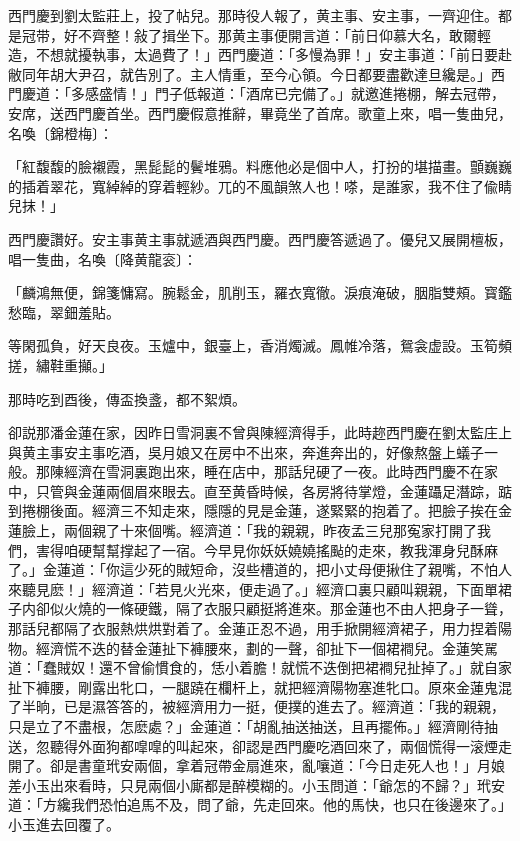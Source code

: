 西門慶到劉太監莊上，投了帖兒。那時役人報了，黄主事、安主事，一齊迎住。都是冠带，好不齊整！敍了揖坐下。那黄主事便開言道：「前日仰慕大名，敢爾輕造，不想就擾執事，太過費了！」西門慶道：「多慢為罪！」安主事道：「前日要赴敝同年胡大尹召，就告別了。主人情重，至今心領。今日都要盡歡達旦纔是。」西門慶道：「多感盛情！」門子低報道：「酒席已完備了。」就邀進捲棚，解去冠帶，安席，送西門慶首坐。西門慶假意推辭，畢竟坐了首席。歌童上來，唱一隻曲兒，名喚〔錦橙梅〕：

\begin{myquote}
「紅馥馥的臉襯霞，黑髭髭的鬢堆鴉。料應他必是個中人，打扮的堪描畫。顫巍巍的插着翠花，寬綽綽的穿着輕紗。兀的不風韻煞人也！嗏，是誰家，我不住了偸睛兒抹！」
\end{myquote}

西門慶讚好。安主事黄主事就遞酒與西門慶。西門慶答遞過了。優兒又展開檀板，唱一隻曲，名喚〔降黄龍衮〕：

\begin{myquote}
「麟鴻無便，錦箋慵寫。腕鬆金，肌削玉，羅衣寬徹。淚痕淹破，胭脂雙頰。寳鑑愁臨，翠鈿羞貼。

等閑孤負，好天良夜。玉爐中，銀臺上，香消燭滅。鳳帷冷落，鴛衾虚設。玉筍頻搓，繡鞋重攧。」
\end{myquote}

那時吃到酉後，傳盃換盞，都不絮煩。

卻説那潘金蓮在家，因昨日雪洞裏不曾與陳經濟得手，此時趂西門慶在劉太監庄上與黄主事安主事吃酒，吳月娘又在房中不出來，奔進奔出的，好像熬盤上蟻子一般。那陳經濟在雪洞裏跑出來，睡在店中，那話兒硬了一夜。此時西門慶不在家中，只管與金蓮兩個眉來眼去。直至黄昏時候，各房將待掌燈，金蓮躡足潛踪，踮到捲棚後面。經濟三不知走來，隱隱的見是金蓮，遂緊緊的抱着了。把臉子挨在金蓮臉上，兩個親了十來個嘴。經濟道：「我的親親，昨夜孟三兒那寃家打開了我們，害得咱硬幫幫撑起了一宿。今早見你妖妖嬈嬈搖颭的走來，教我渾身兒酥麻了。」金蓮道：「你這少死的賊短命，沒些槽道的，把小丈母便揪住了親嘴，不怕人來聽見麽！」經濟道：「若見火光來，便走過了。」經濟口裏只顧叫親親，下面單裙子内卻似火燒的一條硬鐵，隔了衣服只顧挺將進來。那金蓮也不由人把身子一聳，那話兒都隔了衣服熱烘烘對着了。金蓮正忍不過，用手掀開經濟裙子，用力捏着陽物。經濟慌不迭的替金蓮扯下褲腰來，劃的一聲，卻扯下一個裙襇兒。金蓮笑駡道：「蠢賊奴！還不曾偷慣食的，恁小着膽！就慌不迭倒把裙襇兒扯掉了。」就自家扯下褲腰，剛露出牝口，一腿蹺在欄杆上，就把經濟陽物塞進牝口。原來金蓮鬼混了半晌，已是濕答答的，被經濟用力一挺，便撲的進去了。經濟道：「我的親親，只是立了不盡根，怎麽處？」金蓮道：「胡亂抽送抽送，且再擺佈。」經濟剛待抽送，忽聽得外面狗都噑噑的叫起來，卻認是西門慶吃酒回來了，兩個慌得一滚煙走開了。卻是書童玳安兩個，拿着冠帶金扇進來，亂嚷道：「今日走死人也！」月娘差小玉出來看時，只見兩個小廝都是醉模糊的。小玉問道：「爺怎的不歸？」玳安道：「方纔我們恐怕追馬不及，問了爺，先走回來。他的馬快，也只在後邊來了。」小玉進去回覆了。

